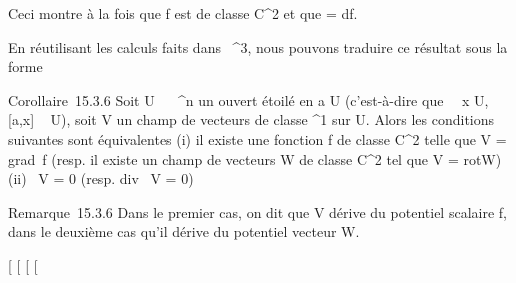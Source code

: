 Ceci montre à la fois que f est de classe C^2 et que \omega = df.

En réutilisant les calculs faits dans ~^3, nous pouvons
traduire ce résultat sous la forme

Corollaire~15.3.6 Soit U \subset~ ~^n un ouvert étoilé en a \in U
(c'est-à-dire que \forall~~x \in U, {[}a,x{]} \subset~ U), soit
V un champ de vecteurs de classe ^1 sur U. Alors les
conditions suivantes sont équivalentes (i) il existe une fonction f de
classe C^2 telle que V = grad~f
(resp. il existe un champ de vecteurs W de classe C^2 tel que
V = rotW) (ii) \rot~V
= 0 (resp. div~ V = 0)

Remarque~15.3.6 Dans le premier cas, on dit que V dérive du potentiel
scalaire f, dans le deuxième cas qu'il dérive du potentiel vecteur W.

{[}
{[}
{[}
{[}
